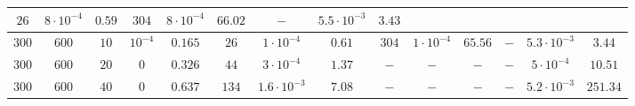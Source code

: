 \documentclass[twocolumn]{svjour3}
\begin{document}
\begin{table*}[!htp]
\begin{center}
\begin{tabular}{|c|c|c|c|c|c|c|c|c|c|c|c|c|c|}
\multicolumn{1}{|c}{$26$} & \multicolumn{1}{c}{$8\cdot 10^{-4}$} & \multicolumn{1}{c|}{$0.59$} &
\multicolumn{1}{|c}{$304$} & \multicolumn{1}{c}{$8\cdot 10^{-4}$} & \multicolumn{1}{c|}{$66.02$} &
\multicolumn{1}{|c}{$-$} & \multicolumn{1}{c}{$5.5\cdot 10^{-3}$} & \multicolumn{1}{c}{$3.43$} \\
\hline
\multicolumn{1}{c}{$300$} & \multicolumn{1}{c}{$600$} & \multicolumn{1}{c}{$10$} & \multicolumn{1}{c|}{$10^{-4}$} & $0.165$ & 
\multicolumn{1}{|c}{$26$} & \multicolumn{1}{c}{$1\cdot 10^{-4}$} & \multicolumn{1}{c|}{$0.61$} &
\multicolumn{1}{|c}{$304$} & \multicolumn{1}{c}{$1\cdot 10^{-4}$} & \multicolumn{1}{c|}{$65.56$} &
\multicolumn{1}{|c}{$-$} & \multicolumn{1}{c}{$5.3\cdot 10^{-3}$} & \multicolumn{1}{c}{$3.44$} \\
\hline
\multicolumn{1}{c}{$300$} & \multicolumn{1}{c}{$600$} & \multicolumn{1}{c}{$20$} & \multicolumn{1}{c|}{$0$} & $0.326$ & 
\multicolumn{1}{|c}{$44$} & \multicolumn{1}{c}{$3\cdot 10^{-4}$} & \multicolumn{1}{c|}{$1.37$} &
\multicolumn{1}{|c}{$-$} & \multicolumn{1}{c}{$-$} & \multicolumn{1}{c|}{$-$} &
\multicolumn{1}{|c}{$-$} & \multicolumn{1}{c}{$5\cdot 10^{-4}$} & \multicolumn{1}{c}{$10.51$} \\
\hline
\multicolumn{1}{c}{$300$} & \multicolumn{1}{c}{$600$} & \multicolumn{1}{c}{$40$} & \multicolumn{1}{c|}{$0$} & $0.637$ & 
\multicolumn{1}{|c}{$134$} & \multicolumn{1}{c}{$1.6\cdot 10^{-3}$} & \multicolumn{1}{c|}{$7.08$} &
\multicolumn{1}{|c}{$-$} & \multicolumn{1}{c}{$-$} & \multicolumn{1}{c|}{$-$} &
\multicolumn{1}{|c}{$-$} & \multicolumn{1}{c}{$5.2\cdot 10^{-3}$} & \multicolumn{1}{c}{$251.34$} \\


\end{tabular}
\end{center}
\end{table*}
\end{document}
